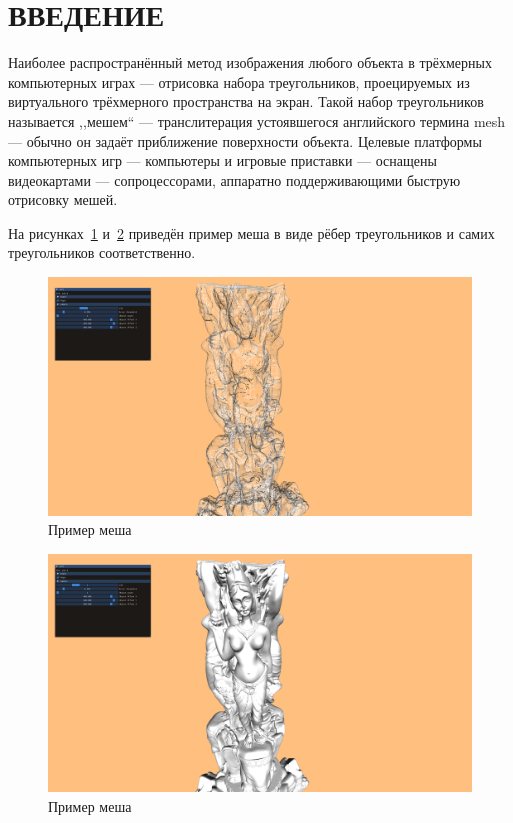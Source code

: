 \clearpage
\section{ВВЕДЕНИЕ}
Наиболее распространённый метод изображения любого объекта в трёхмерных компьютерных играх --- отрисовка набора треугольников, проецируемых из виртуального трёхмерного пространства на экран.
Такой набор треугольников называется ,,мешем`` --- транслитерация устоявшегося английского термина mesh --- обычно он задаёт приближение поверхности объекта.
Целевые платформы компьютерных игр --- компьютеры и игровые приставки --- оснащены видеокартами --- сопроцессорами, аппаратно поддерживающими быструю отрисовку мешей.

На рисунках~\ref{fig:mesh-example-wireframe} и~\ref{fig:mesh-example-solid} приведён пример меша в виде рёбер треугольников и самих треугольников соответственно.

\begin{figure}[ht]
    \centering
    \includegraphics[width=\textwidth]{pics/mesh-example-wireframe.png}
    \caption{Пример меша}
    \label{fig:mesh-example-wireframe}
\end{figure}

\begin{figure}[ht]
    \centering
    \includegraphics[width=\textwidth]{pics/mesh-example-solid.png}
    \caption{Пример меша}
    \label{fig:mesh-example-solid}
\end{figure}


